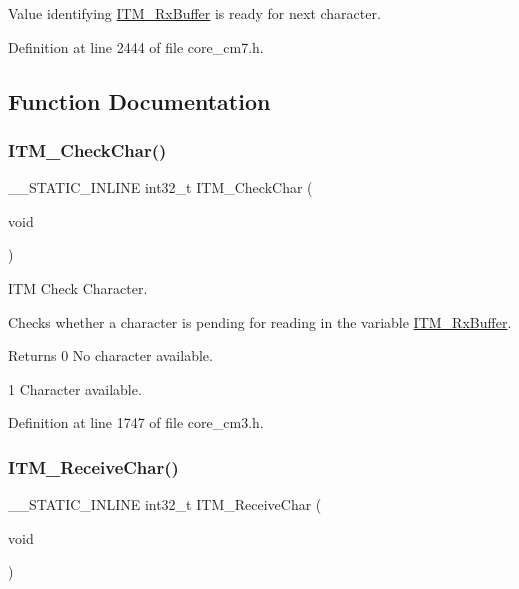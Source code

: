 Value identifying \hyperlink{group___c_m_s_i_s__core___debug_functions_ga12e68e55a7badc271b948d6c7230b2a8}{I\+T\+M\+\_\+\+Rx\+Buffer} is ready for next character. 

Definition at line 2444 of file core\+\_\+cm7.\+h.



\subsection{Function Documentation}
\mbox{\label{group___c_m_s_i_s__core___debug_functions_gae61ce9ca5917735325cd93b0fb21dd29}} 
\subsubsection{\texorpdfstring{I\+T\+M\+\_\+\+Check\+Char()}{ITM\_CheckChar()}}
{\footnotesize\ttfamily \+\_\+\+\_\+\+S\+T\+A\+T\+I\+C\+\_\+\+I\+N\+L\+I\+NE int32\+\_\+t I\+T\+M\+\_\+\+Check\+Char (\begin{DoxyParamCaption}\item[{void}]{ }\end{DoxyParamCaption})}



I\+TM Check Character. 

Checks whether a character is pending for reading in the variable \hyperlink{group___c_m_s_i_s__core___debug_functions_ga12e68e55a7badc271b948d6c7230b2a8}{I\+T\+M\+\_\+\+Rx\+Buffer}. \begin{DoxyReturn}{Returns}
0 No character available. 

1 Character available. 
\end{DoxyReturn}


Definition at line 1747 of file core\+\_\+cm3.\+h.

\mbox{\label{group___c_m_s_i_s__core___debug_functions_gac3ee2c30a1ac4ed34c8a866a17decd53}} 
\subsubsection{\texorpdfstring{I\+T\+M\+\_\+\+Receive\+Char()}{ITM\_ReceiveChar()}}
{\footnotesize\ttfamily \+\_\+\+\_\+\+S\+T\+A\+T\+I\+C\+\_\+\+I\+N\+L\+I\+NE int32\+\_\+t I\+T\+M\+\_\+\+Receive\+Char (\begin{DoxyParamCaption}\item[{void}]{ }\end{DoxyParamCaption})}



